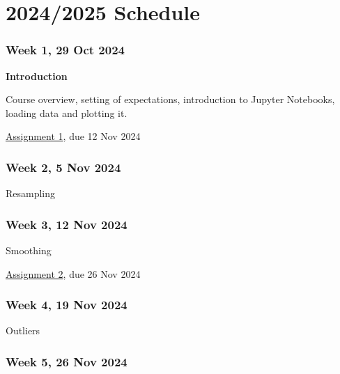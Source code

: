 \documentclass[
  letterpaper,
  DIV=11,
  numbers=noendperiod]{scrreprt}
\begin{document}

\chapter*{2024/2025 Schedule}\label{schedule}


\subsection*{Week 1, 29 Oct 2024}\label{week-1-29-oct-2024}

\textbf{Introduction}

Course overview, setting of expectations, introduction to Jupyter
Notebooks, loading data and plotting it.

\href{assignments/assignment1}{Assignment 1}, due 12 Nov 2024

\subsection*{Week 2, 5 Nov 2024}\label{week-2-5-nov-2024}

Resampling

\subsection*{Week 3, 12 Nov 2024}\label{week-3-12-nov-2024}

Smoothing

\href{assignments/assignment2}{Assignment 2}, due 26 Nov 2024

\subsection*{Week 4, 19 Nov 2024}\label{week-4-19-nov-2024}

Outliers

\subsection*{Week 5, 26 Nov 2024}\label{week-5-26-nov-2024}
\end{document}
